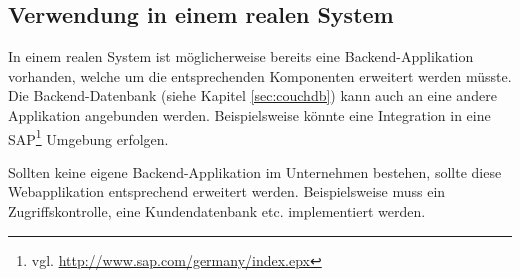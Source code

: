 \subsection{Verwendung in einem realen System}

In einem realen System ist möglicherweise bereits eine Backend-Applikation
	vorhanden, welche um die entsprechenden Komponenten erweitert werden
	müsste. Die Backend-Datenbank (siehe Kapitel \ref{sec:couchdb}) kann
	auch an eine andere Applikation angebunden werden. Beispielsweise
	könnte eine Integration in eine SAP\footnote{vgl.
	\url{http://www.sap.com/germany/index.epx}} Umgebung erfolgen.
	
Sollten keine eigene Backend-Applikation im Unternehmen bestehen, sollte
	diese Webapplikation entsprechend erweitert werden. Beispielsweise
	muss ein Zugriffskontrolle, eine Kundendatenbank etc. implementiert
	werden.